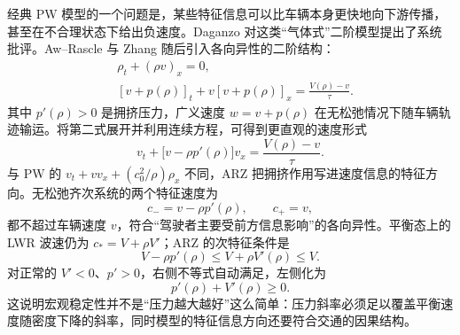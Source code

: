 \documentclass[11pt,a4paper,openany]{book}
\numberwithin{equation}{chapter}
\numberwithin{figure}{chapter}
\numberwithin{table}{chapter}
\begin{document}
经典 PW 模型的一个问题是，某些特征信息可以比车辆本身更快地向下游传播，甚至在不合理状态下给出负速度。Daganzo 对这类“气体式”二阶模型提出了系统批评\cite{daganzo1995}。Aw--Rascle 与 Zhang 随后引入各向异性的二阶结构\cite{awrascle2000,zhang2002}：
\begin{subequations}
\label{eq:arz}
\begin{align}
&\rho_t+(\rho v)_x=0,\\
&[v+p(\rho)]_t+v[v+p(\rho)]_x
=\frac{V(\rho)-v}{\tau}.
\end{align}
\end{subequations}
其中 $p'(\rho)>0$ 是拥挤压力，广义速度 $w=v+p(\rho)$ 在无松弛情况下随车辆轨迹输运。将第二式展开并利用连续方程，可得到更直观的速度形式
\begin{equation}
v_t+\bigl[v-\rho p'(\rho)\bigr]v_x
=\frac{V(\rho)-v}{\tau}.
\label{eq:arz-speed-form}
\end{equation}
与 PW 的 $v_t+vv_x+(c_0^2/\rho)\rho_x$ 不同，ARZ 把拥挤作用写进速度信息的特征方向。无松弛齐次系统的两个特征速度为
\begin{equation}
c_- =v-\rho p'(\rho),
\qquad c_+=v,
\label{eq:arz-characteristics}
\end{equation}
都不超过车辆速度 $v$，符合“驾驶者主要受前方信息影响”的各向异性。平衡态上的 LWR 波速仍为 $c_*=V+\rho V'$；ARZ 的次特征条件是
\begin{equation}
V-\rho p'(\rho)
\le V+\rho V'(\rho)
\le V.
\label{eq:arz-subcharacteristic}
\end{equation}
对正常的 $V'<0$、$p'>0$，右侧不等式自动满足，左侧化为
\begin{equation}
p'(\rho)+V'(\rho)\ge0.
\label{eq:arz-simple-stability}
\end{equation}
这说明宏观稳定性并不是“压力越大越好”这么简单：压力斜率必须足以覆盖平衡速度随密度下降的斜率，同时模型的特征信息方向还要符合交通的因果结构。
\end{document}

